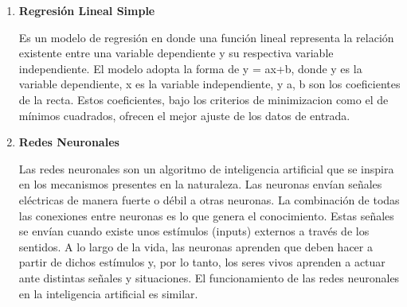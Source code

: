 \begin{enumerate}

	
	\item \textbf{Regresión Lineal Simple}
	
	Es un modelo de regresión en donde una función lineal representa la relación existente entre una variable dependiente y su respectiva variable independiente. El modelo adopta la forma de y = ax+b, donde y es la variable dependiente, x es la variable independiente, y a, b son los coeficientes de la recta. Estos coeficientes, bajo los criterios de minimizacion como el de mínimos cuadrados, ofrecen el mejor ajuste de los datos de entrada. \cite{DELGADO2019}
	
	\item \textbf{Redes Neuronales}
	
	Las redes neuronales son un algoritmo de inteligencia artificial que se inspira en los mecanismos presentes en la naturaleza. Las neuronas envían señales eléctricas de manera fuerte o débil a otras neuronas. La combinación de todas las conexiones entre neuronas es lo que genera el conocimiento. Estas señales se envían cuando existe unos estímulos (inputs) externos a través de los sentidos. A lo largo de la vida, las neuronas aprenden que deben hacer a partir de dichos estímulos y, por lo tanto, los seres vivos aprenden a actuar ante distintas señales y situaciones. El funcionamiento de las redes neuronales en la inteligencia artificial es similar.
	

\end{enumerate}
